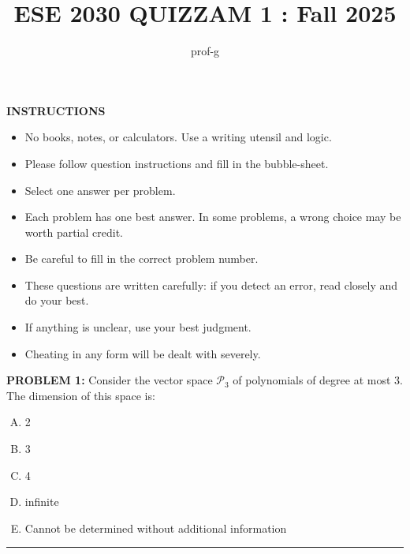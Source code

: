 \documentclass[12pt]{amsart}
\title{ESE 2030 QUIZZAM 1 : Fall 2025}
\author{prof-g}
\newcommand{\divider}{
  \vspace{-1em} %
  \noindent
  \raisebox{-0.15ex}{\textbullet}%
  \hspace{0.5em}%
  \rule[0.5ex]{0.95\textwidth}{1.0pt}%
  \hspace{0.5em}%
  \raisebox{-0.15ex}{\textbullet}%
  \vspace{0em} %
}
\begin{document}
\maketitle

\begin{center}
    {\bf INSTRUCTIONS}
\end{center}

\begin{itemize}
\item 
No books, notes, or calculators. Use a writing utensil and logic. 

\item 
Please follow question instructions and fill in the bubble-sheet. 

\item 
Select one answer per problem.

\item 
Each problem has one best answer. In some problems, a wrong choice may be worth partial credit. 

\item 
Be careful to fill in the correct problem number. 

\item 
These questions are written carefully: if you detect an error, read closely and do your best.

\item 
If anything is unclear, use your best judgment. 

\item 
Cheating in any form will be dealt with severely. 
\end{itemize}

\newpage




{\bf PROBLEM 1:}
Consider the vector space $\mathcal{P}_3$ of polynomials of degree at most 3. The dimension of this space is:
\begin{enumerate}[(A)]
\item 2
\item 3
\item 4
\item infinite
\item Cannot be determined without additional information
\end{enumerate}
\divider
\end{document}
